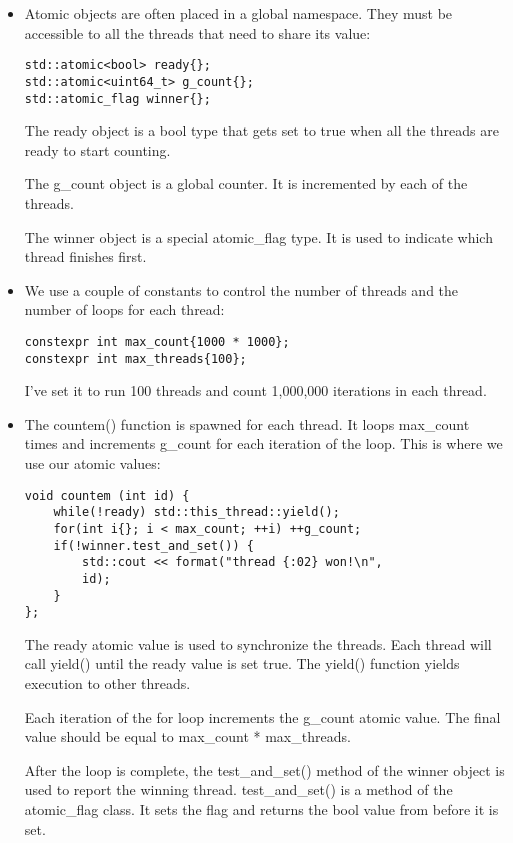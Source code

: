 \begin{itemize}
\item 
Atomic objects are often placed in a global namespace. They must be accessible to all the threads that need to share its value:

\begin{lstlisting}[style=styleCXX]
std::atomic<bool> ready{};
std::atomic<uint64_t> g_count{};
std::atomic_flag winner{};
\end{lstlisting}

The ready object is a bool type that gets set to true when all the threads are ready to start counting.

The g\_count object is a global counter. It is incremented by each of the threads.

The winner object is a special atomic\_flag type. It is used to indicate which thread finishes first.

\item 
We use a couple of constants to control the number of threads and the number of loops for each thread:

\begin{lstlisting}[style=styleCXX]
constexpr int max_count{1000 * 1000};
constexpr int max_threads{100};
\end{lstlisting}

I've set it to run 100 threads and count 1,000,000 iterations in each thread.

\item 
The countem() function is spawned for each thread. It loops max\_count times and increments g\_count for each iteration of the loop. This is where we use our atomic values:

\begin{lstlisting}[style=styleCXX]
void countem (int id) {
	while(!ready) std::this_thread::yield();
	for(int i{}; i < max_count; ++i) ++g_count;
	if(!winner.test_and_set()) {
		std::cout << format("thread {:02} won!\n",
		id);
	}
};
\end{lstlisting}

The ready atomic value is used to synchronize the threads. Each thread will call yield() until the ready value is set true. The yield() function yields execution to other threads.

Each iteration of the for loop increments the g\_count atomic value. The final value should be equal to max\_count * max\_threads.

After the loop is complete, the test\_and\_set() method of the winner object is used to report the winning thread. test\_and\_set() is a method of the atomic\_flag class. It sets the flag and returns the bool value from before it is set.


\end{itemize}
